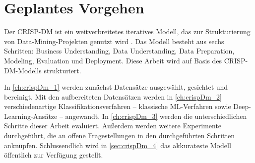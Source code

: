 \section{Geplantes Vorgehen}

Der \ac{CRISP-DM} ist ein weitverbreitetes iteratives Modell, das zur Strukturierung von Data-Mining-Projekten genutzt wird \autocite{martinez-plumed_casp-dm_2017, chapman_crisp-dm_2000}. Das Modell besteht aus sechs Schritten: Business Understanding, Data Understanding, Data Preparation, Modeling, Evaluation und Deployment. Diese Arbeit wird auf Basis des \ac{CRISP-DM}-Modells strukturiert.

In \autoref{ch:crispDm_1} werden zunächst Datensätze ausgewählt, gesichtet und bereinigt. Mit den aufbereiteten Datensätzen werden in \autoref{ch:crispDm_2} verschiedenartige Klassifikationsverfahren -- klassische \ac{ML}-Verfahren sowie Deep-Learning-Ansätze -- angewandt. In \autoref{ch:crispDm_3} werden die unterschiedlichen Schritte dieser Arbeit evaluiert. Außerdem werden weitere Experimente durchgeführt, die an offene Fragestellungen in den durchgeführten Schritten anknüpfen. Schlussendlich wird in \autoref{sec:crispDm_4} das akkurateste Modell öffentlich zur Verfügung gestellt.
